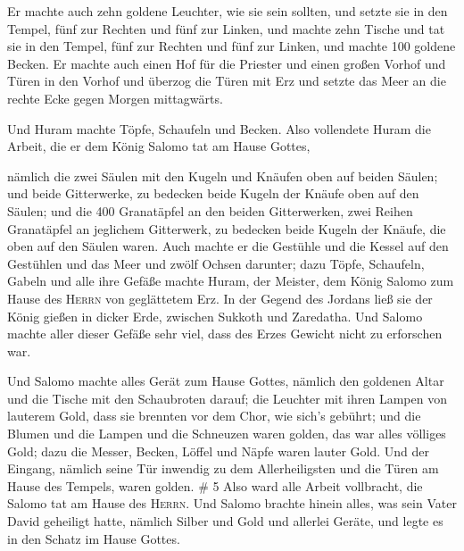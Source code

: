  Er machte auch zehn goldene Leuchter, wie sie sein
sollten, und setzte sie in den Tempel, fünf zur Rechten und fünf zur
Linken,  und machte zehn Tische und tat sie in den Tempel,
fünf zur Rechten und fünf zur Linken, und machte 100 goldene Becken.
 Er machte auch einen Hof für die Priester und einen
großen Vorhof und Türen in den Vorhof und überzog die Türen mit Erz
 und setzte das Meer an die rechte Ecke gegen Morgen
mittagwärts.

 Und Huram machte Töpfe, Schaufeln und Becken. Also
vollendete Huram die Arbeit, die er dem König Salomo tat am Hause
Gottes,

 nämlich die zwei Säulen mit den Kugeln und Knäufen oben
auf beiden Säulen; und beide Gitterwerke, zu bedecken beide Kugeln der
Knäufe oben auf den Säulen;  und die 400 Granatäpfel an
den beiden Gitterwerken, zwei Reihen Granatäpfel an jeglichem
Gitterwerk, zu bedecken beide Kugeln der Knäufe, die oben auf den Säulen
waren.  Auch machte er die Gestühle und die Kessel auf
den Gestühlen  und das Meer und zwölf Ochsen darunter;
 dazu Töpfe, Schaufeln, Gabeln und alle ihre Gefäße
machte Huram, der Meister, dem König Salomo zum Hause des \textsc{Herrn}
von geglättetem Erz.  In der Gegend des Jordans ließ sie
der König gießen in dicker Erde, zwischen Sukkoth und Zaredatha.
 Und Salomo machte aller dieser Gefäße sehr viel, dass
des Erzes Gewicht nicht zu erforschen war.

 Und Salomo machte alles Gerät zum Hause Gottes, nämlich
den goldenen Altar und die Tische mit den Schaubroten darauf;
 die Leuchter mit ihren Lampen von lauterem Gold, dass
sie brennten vor dem Chor, wie sich's gebührt;  und die
Blumen und die Lampen und die Schneuzen waren golden, das war alles
völliges Gold;  dazu die Messer, Becken, Löffel und Näpfe
waren lauter Gold. Und der Eingang, nämlich seine Tür inwendig zu dem
Allerheiligsten und die Türen am Hause des Tempels, waren golden. \# 5
 Also ward alle Arbeit vollbracht, die Salomo tat am Hause
des \textsc{Herrn}. Und Salomo brachte hinein alles, was sein Vater
David geheiligt hatte, nämlich Silber und Gold und allerlei Geräte, und
legte es in den Schatz im Hause Gottes.

